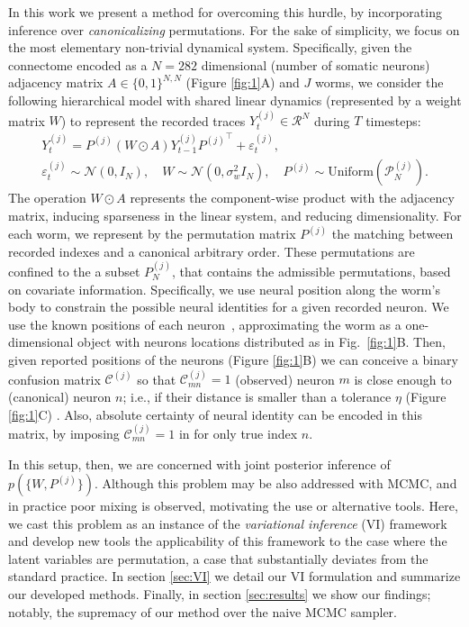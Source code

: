 \documentclass{article}
\begin{document}
In this work we present a method for overcoming this hurdle, by incorporating inference over \emph{canonicalizing} permutations. For the sake of simplicity, we focus on the most elementary non-trivial dynamical system. Specifically, given the connectome \citep{varshney2011structural} encoded as a $N=282$ dimensional (number of somatic neurons) adjacency matrix $A\in \{0,1\}^{N,N}$ (Figure \ref{fig:1}A) and $J$ worms, we consider the following hierarchical model with shared linear dynamics (represented by a weight matrix $W$) 
to represent the recorded traces $Y_t^{(j)}\in\mathcal{R}^N$ during $T$ timesteps: \begin{eqnarray}
\label{eq:generalmodel}
Y_t^{(j)}= P^{(j)}\left(W\odot A \right)Y^{(j)}_{t-1} {P^{(j)}}^\top+\varepsilon^{(j)}_t, \\ \nonumber
 \varepsilon^{(j)}_t\sim \mathcal{N}(0,I_N), \quad W\sim \mathcal{N}(0,\sigma_w^2 I_N), \quad P^{(j)}\sim\mathrm{Uniform}(\mathcal{P}^{(j)}_N).
 \end{eqnarray}
The operation $W\odot A$ represents the component-wise product with the adjacency matrix, inducing sparseness in the linear system, and reducing dimensionality. For each worm, we represent by the permutation matrix $P^{(j)}$ the matching between recorded indexes and a canonical arbitrary order. These permutations are confined to the a subset $P^{(j)}_N$, that contains the admissible permutations, based on covariate information. Specifically, we use neural position along the worm's body to constrain the
possible neural identities for a given recorded neuron.
We use the known positions of each neuron~\citep{wormatlas}, approximating
the worm as a one-dimensional object with neurons locations distributed
as in Fig.~\ref{fig:1}B. Then, given reported positions of the
neurons (Figure \ref{fig:1}B) we can conceive a binary confusion matrix
$\mathcal{C}^{(j)}$ so that $\mathcal{C}^{(j)}_{mn}=1$ (observed) neuron $m$ is close enough
to (canonical) neuron $n$; i.e., if their distance is smaller than a
tolerance $\eta$ (Figure \ref{fig:1}C) . Also, absolute certainty of neural identity can be encoded in this matrix, by imposing $\mathcal{C}^{(j)}_{mn}=1$ in for only true index $n$.


In this setup, then, we are concerned with joint posterior inference of $p(\{W,P^{(j)}\})$. Although this problem may be also addressed with MCMC, and in practice poor mixing is observed, motivating the use or alternative tools. Here, we cast this problem as an instance of the \emph{variational inference} (VI) framework \citep{Blei2017} and develop new tools the applicability of this framework to the case where the latent variables are permutation, a case that substantially deviates from the standard practice.  In section \ref{sec:VI} we detail our VI formulation and summarize our developed methods. Finally, in section \ref{sec:results} we show our findings; notably, the supremacy of our method over the naive MCMC sampler.
\end{document}
